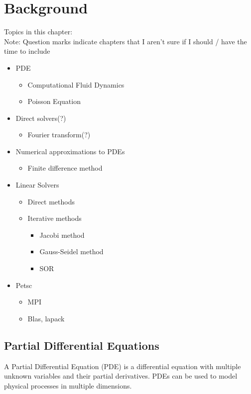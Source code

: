 \chapter{Background}

Topics in this chapter:\\
Note: Question marks indicate chapters that I aren't sure if I should / have the time to include
\begin{itemize}
	\item PDE
	\begin{itemize}
		\item Computational Fluid Dynamics
		\item Poisson Equation
	\end{itemize}
	\item Direct solvers(?)
	\begin{itemize}
		\item Fourier transform(?)
	\end{itemize}
	\item Numerical approximations to PDEs
	\begin{itemize}	
		\item Finite difference method
	\end{itemize}
	\item Linear Solvers
	\begin{itemize}
		\item Direct methods
		\item Iterative methods
		\begin{itemize}
			\item Jacobi method
			\item Gauss-Seidel method
			\item SOR
		\end{itemize}
	\end{itemize}
	\item Petsc
	\begin{itemize}
		\item MPI
		\item Blas, lapack
	\end{itemize}
\end{itemize}

\section*{Partial Differential Equations}

A Partial Differential Equation (PDE) is a differential equation with multiple 
unknown variables and their partial derivatives. PDEs can be used to model physical 
processes in multiple dimensions. 

